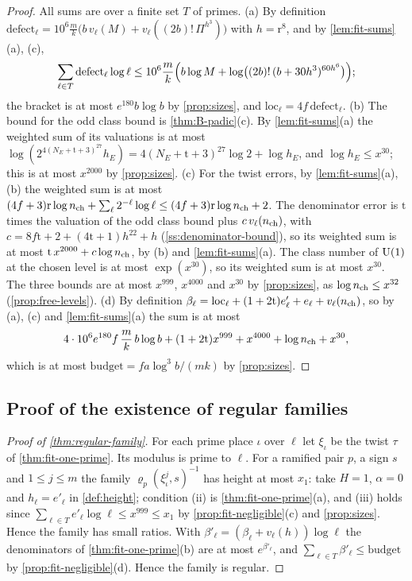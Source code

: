 \begin{proof}
All sums are over a finite set $T$ of primes. (a) By definition $\mathrm{defect}_\ell=10^6\frac mk\bigl(b\,v_\ell(M)+v_\ell((2b)!\,\Pi^{h^3})\bigr)$ with $h=\mathrm r^8$, and by \cref{lem:fit-sums}(a), (c),
\[
  \sum_{\ell\in T}\mathrm{defect}_\ell\log\ell\le10^6\frac mk\Bigl(b\log M+\log\bigl((2b)!\,(b+30h^3)^{60h^6}\bigr)\Bigr);
\]
the bracket is at most $e^{180}b\log b$ by \cref{prop:sizes}, and $\mathrm{loc}_\ell=4f\,\mathrm{defect}_\ell$. (b) The bound for the odd class bound is \cref{thm:B-padic}(c). By \cref{lem:fit-sums}(a) the weighted sum of its valuations is at most $\log(2^{4(N_E+\mathrm t+3)^{27}}h_E)=4(N_E+\mathrm t+3)^{27}\log2+\log h_E$, and
$\log h_E\le x^{30}$; this is at most $x^{2000}$ by \cref{prop:sizes}. (c) For the twist errors, by \cref{lem:fit-sums}(a), (b) the weighted sum is at most $(4f+3)\mathrm r\log n_{\rm ch}+\sum_\ell2^{-\ell}\log\ell\le(4f+3)\mathrm r\log n_{\rm ch}+2$. The denominator error is $\mathrm t$ times the valuation of the odd class bound plus $c\,v_\ell(n_{\rm ch})$,
with $c=8f\mathrm t+2+(4\mathrm t+1)h^{22}+h$ (\cref{ss:denominator-bound}), so its weighted sum is at most $\mathrm t\,x^{2000}+c\log n_{\rm ch}$, by (b) and \cref{lem:fit-sums}(a). The class number of $\operatorname{U}(1)$ at the chosen level is at most $\exp(x^{30})$, so its weighted sum is at most $x^{30}$. The three bounds are at most $x^{999}$, $x^{4000}$ and
$x^{30}$ by \cref{prop:sizes}, as $\log n_{\rm ch}\le x^{32}$ (\cref{prop:free-levels}). (d) By definition $\beta_\ell=\mathrm{loc}_\ell+(1+2\mathrm t)e'_\ell+e_\ell+v_\ell(n_{\rm ch})$, so by (a), (c) and \cref{lem:fit-sums}(a) the sum is at most
\[
  4\cdot10^6e^{180}f\,\frac mk\,b\log b+(1+2\mathrm t)x^{999}+x^{4000}+\log n_{\rm ch}+x^{30},
\]
which is at most $\mathrm{budget}=fa\log^3b/(mk)$ by \cref{prop:sizes}.
\end{proof}

\subsection{Proof of the existence of regular families}\label{ss:fit-proof}

\begin{proof}[Proof of \cref{thm:regular-family}]
For each prime place $\iota$ over $\ell$ let $\xi_\iota$ be the twist $\tau$ of \cref{thm:fit-one-prime}. Its modulus is prime to $\ell$. For a ramified pair $p$, a sign $s$ and $1\le j\le m$ the family $\varrho_p(\xi^j_\iota,s)^{-1}$ has height
at most $x_1$: take $H=1$, $\alpha=0$ and $h_\ell=e'_\ell$ in \cref{def:height}; condition (ii) is \cref{thm:fit-one-prime}(a), and (iii) holds since $\sum_{\ell\in T}e'_\ell\log\ell\le x^{999}\le x_1$ by \cref{prop:fit-negligible}(c) and \cref{prop:sizes}. Hence the family has small ratios. With
$\beta'_\ell=(\beta_\ell+v_\ell(h))\log\ell$ the denominators of \cref{thm:fit-one-prime}(b) are at most $e^{\beta'_\ell}$, and $\sum_{\ell\in T}\beta'_\ell\le\mathrm{budget}$ by \cref{prop:fit-negligible}(d). Hence the family is regular.
\end{proof}
